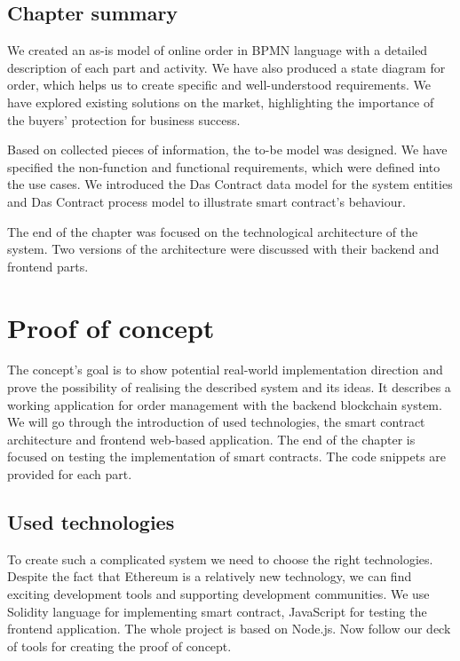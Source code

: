 \documentclass[thesis=M,english]{FITthesis}[2019/12/23]
\begin{document}
\section{Chapter summary}

We created an as-is model of online order in BPMN language with a detailed description of each part and activity. We have also produced a state diagram for order, which helps us to create specific and well-understood requirements. We have explored existing solutions on the market, highlighting the importance of the buyers' protection for business success.

Based on collected pieces of information, the to-be model was designed. We have specified the non-function and functional requirements, which were defined into the use cases. We introduced the Das Contract data model for the system entities and Das Contract process model to illustrate smart contract's behaviour.

The end of the chapter was focused on the technological architecture of the system. Two versions of the architecture were discussed with their backend and frontend parts.


\chapter{Proof of concept} \label{proofOfConcept}

The concept's goal is to show potential real-world implementation direction and prove the possibility of realising the described system and its ideas. It describes a working application for order management with the backend blockchain system. We will go through the introduction of used technologies, the smart contract architecture and frontend web-based application. The end of the chapter is focused on testing the implementation of smart contracts. The code snippets are provided for each part.

\section{Used technologies}

To create such a complicated system we need to choose the right technologies. Despite the fact that Ethereum is a relatively new technology, we can find exciting development tools and supporting development communities. We use Solidity language for implementing smart contract, JavaScript for testing the frontend application. The whole project is based on Node.js. Now follow our deck of tools for creating the proof of concept.
\end{document}
